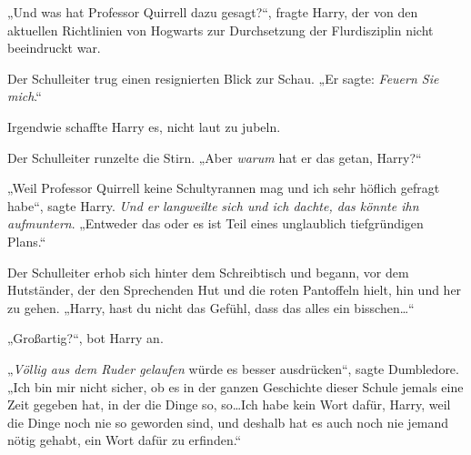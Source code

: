 „Und was hat Professor Quirrell dazu gesagt?“, fragte Harry, der von den aktuellen Richtlinien von Hogwarts zur Durchsetzung der Flurdisziplin nicht beeindruckt war.

Der Schulleiter trug einen resignierten Blick zur Schau. „Er sagte: \emph{Feuern Sie mich}.“

Irgendwie schaffte Harry es, nicht laut zu jubeln.

Der Schulleiter runzelte die Stirn. „Aber \emph{warum} hat er das getan, Harry?“

„Weil Professor Quirrell keine Schultyrannen mag und ich sehr höflich gefragt habe“, sagte Harry. \emph{Und er} \emph{langweilte} \emph{sich und ich dachte, das könnte ihn aufmuntern}. „Entweder das oder es ist Teil eines unglaublich tiefgründigen Plans.“

Der Schulleiter erhob sich hinter dem Schreibtisch und begann, vor dem Hutständer, der den Sprechenden Hut und die roten Pantoffeln hielt, hin und her zu gehen. „Harry, hast du nicht das Gefühl, dass das alles ein bisschen…“

„Großartig?“, bot Harry an.

„\emph{Völlig aus dem Ruder gelaufen} würde es besser ausdrücken“, sagte Dumbledore. „Ich bin mir nicht sicher, ob es in der ganzen Geschichte dieser Schule jemals eine Zeit gegeben hat, in der die Dinge so, so…Ich habe kein Wort dafür, Harry, weil die Dinge noch nie so geworden sind, und deshalb hat es auch noch nie jemand nötig gehabt, ein Wort dafür zu erfinden.“

